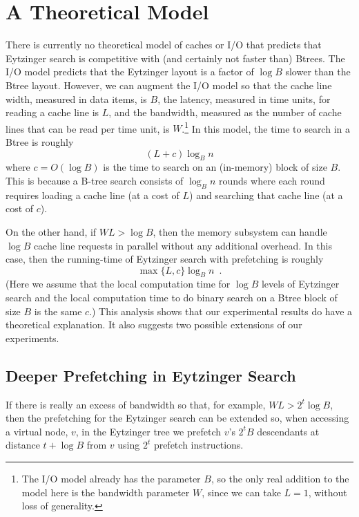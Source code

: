 \documentclass{patmorin}
\begin{document}
\section{A Theoretical Model}

There is currently no theoretical model of caches or I/O that predicts
that Eytzinger search is competitive with (and certainly not faster than)
Btrees.  The I/O model \cite{aggarwal.vitter:input} predicts that the
Eytzinger layout is a factor of $\log B$ slower than the Btree layout.
However, we can augment the I/O model so that the cache line width,
measured in data items, is $B$, the latency, measured in time units, for
reading a cache line is $L$, and the bandwidth, measured as the number
of cache lines that can be read per time unit, is $W$.\footnote{The I/O
model already has the parameter $B$, so the only real addition to the
model here is the bandwidth parameter $W$, since we can take $L=1$,
without loss of generality.}  In this model, the time to search in a
Btree is roughly
\[
     (L+c)\log_B n
\]
where $c=O(\log B)$ is the time to search on an (in-memory) block
of size $B$.  This is because a B-tree search consists of $\log_B n$
rounds where each round requires loading a cache line (at a cost of $L$)
and searching that cache line (at a cost of $c$).

On the other hand, if $WL > \log B$, then the memory subsystem can
handle $\log B$ cache line requests in parallel without any additional
overhead. In this case, then the running-time of Eytzinger search with
prefetching is roughly
\[
    \max\{L,c\}\log_B n \enspace .
\]
(Here we assume that the local computation time for $\log B$ levels of
Eytzinger search and the local computation time to do binary
search on a Btree block of size $B$ is the same $c$.)  This analysis
shows that our experimental results do have a theoretical explanation.
It also suggests two possible extensions of our experiments.

\subsection{Deeper Prefetching in Eytzinger Search}

If there is really an excess of bandwidth so that, for example, $WL >
2^t\log B$, then the prefetching for the Eytzinger search can be extended
so, when accessing a virtual node, $v$, in the Eytzinger tree we prefetch
$v$'s $2^tB$ descendants at distance $t+\log B$ from $v$ using $2^t$
prefetch instructions.
\end{document}
